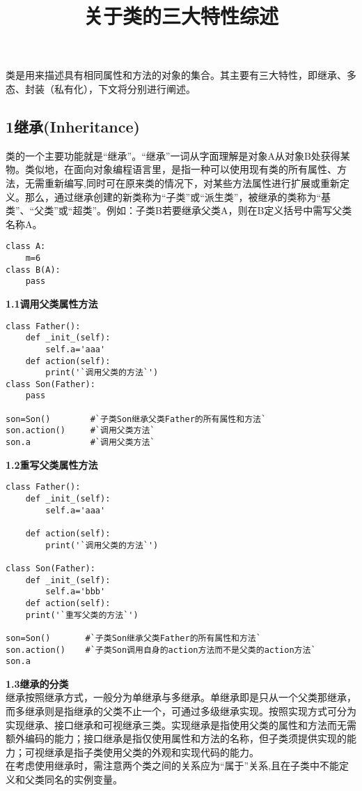 \documentclass[UTF8]{ctexart}
\title{关于类的三大特性综述}
\date{}
\begin{document}
	\maketitle
\begin{flushleft}
\qquad 类是用来描述具有相同属性和方法的对象的集合。其主要有三大特性，即继承、多态、封装（私有化），下文将分别进行阐述。
\subsection*{1\;继承(Inheritance)}
\qquad 类的一个主要功能就是“继承”。“继承”一词从字面理解是对象A从对象B处获得某物。类似地，在面向对象编程语言里，是指一种可以使用现有类的所有属性、方法，无需重新编写,同时可在原来类的情况下，对某些方法属性进行扩展或重新定义。那么，通过继承创建的新类称为“子类”或“派生类”，被继承的类称为“基类”、“父类”或“超类”。例如：子类B若要继承父类A，则在B定义括号中需写父类名称A。\\

\begin{lstlisting}
class A:
    m=6
class B(A):          
    pass
\end{lstlisting}
{\textbf{1.1\:调用父类属性方法}}
\begin{lstlisting}
class Father():
    def _init_(self):
        self.a='aaa'  
    def action(self):
        print('`调用父类的方法`')
class Son(Father):
    pass

son=Son()        #`子类Son继承父类Father的所有属性和方法`
son.action()     #`调用父类方法`
son.a            #`调用父类方法`
\end{lstlisting}

{\textbf{1.2\:重写父类属性方法}}
\begin{lstlisting}
class Father():
    def _init_(self):
        self.a='aaa'

    def action(self):
        print('`调用父类的方法`')

class Son(Father):
    def _init_(self):
        self.a='bbb'
    def action(self):
    print('`重写父类的方法`')

son=Son()       #`子类Son继承父类Father的所有属性和方法`
son.action()    #`子类Son调用自身的action方法而不是父类的action方法`
son.a
\end{lstlisting}
{\textbf{1.3\:继承的分类}}\\
\qquad 继承按照继承方式，一般分为单继承与多继承。单继承即是只从一个父类那继承，而多继承则是指继承的父类不止一个，可通过多级继承实现。按照实现方式可分为实现继承、接口继承和可视继承三类。实现继承是指使用父类的属性和方法而无需额外编码的能力；接口继承是指仅使用属性和方法的名称，但子类须提供实现的能力；可视继承是指子类使用父类的外观和实现代码的能力。\\
\qquad 在考虑使用继承时，需注意两个类之间的关系应为“属于”关系,且在子类中不能定义和父类同名的实例变量。\\


\end{flushleft}
\end{document}
